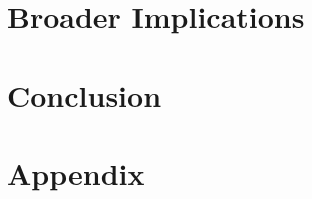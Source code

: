 \documentclass[sigconf, nonacm]{acmart}
\begin{document}
\section{Broader Implications}


\section{Conclusion}





\newpage
\section*{Appendix}

\end{document}
